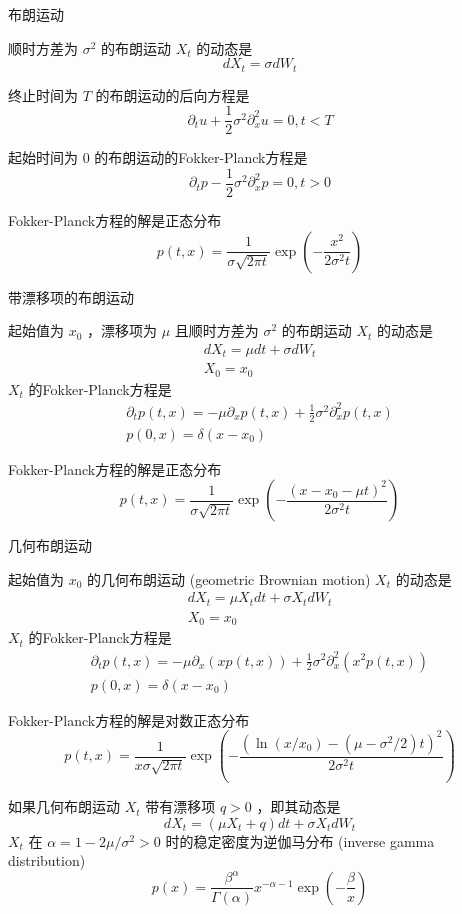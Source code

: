 布朗运动

顺时方差为 $\sigma^2$ 的布朗运动 $X_t$ 的动态是
$$
d X_t=\sigma d W_t
$$

终止时间为 $T$ 的布朗运动的后向方程是
$$
\partial_t u+\frac{1}{2} \sigma^2 \partial_x^2 u=0, t<T
$$

起始时间为 0 的布朗运动的Fokker-Planck方程是
$$
\partial_t p-\frac{1}{2} \sigma^2 \partial_x^2 p=0, t>0
$$

Fokker-Planck方程的解是正态分布
$$
p(t, x)=\frac{1}{\sigma \sqrt{2 \pi t}} \exp \left(-\frac{x^2}{2 \sigma^2 t}\right)
$$

带漂移项的布朗运动

起始值为 $x_0$ ，漂移项为 $\mu$ 且顺时方差为 $\sigma^2$ 的布朗运动 $X_t$ 的动态是
$$
\begin{gathered}
d X_t=\mu d t+\sigma d W_t \\
X_0=x_0
\end{gathered}
$$
$X_t$ 的Fokker-Planck方程是
$$
\begin{gathered}
\partial_t p(t, x)=-\mu \partial_x p(t, x)+\frac{1}{2} \sigma^2 \partial_x^2 p(t, x) \\
p(0, x)=\delta\left(x-x_0\right)
\end{gathered}
$$

Fokker-Planck方程的解是正态分布
$$
p(t, x)=\frac{1}{\sigma \sqrt{2 \pi t}} \exp \left(-\frac{\left(x-x_0-\mu t\right)^2}{2 \sigma^2 t}\right)
$$

几何布朗运动

起始值为 $x_0$ 的几何布朗运动 (geometric Brownian motion) $X_t$ 的动态是
$$
\begin{gathered}
d X_t=\mu X_t d t+\sigma X_t d W_t \\
X_0=x_0
\end{gathered}
$$
$X_t$ 的Fokker-Planck方程是
$$
\begin{gathered}
\partial_t p(t, x)=-\mu \partial_x(x p(t, x))+\frac{1}{2} \sigma^2 \partial_x^2\left(x^2 p(t, x)\right) \\
p(0, x)=\delta\left(x-x_0\right)
\end{gathered}
$$

Fokker-Planck方程的解是对数正态分布
$$
p(t, x)=\frac{1}{x \sigma \sqrt{2 \pi t}} \exp \left(-\frac{\left(\ln \left(x / x_0\right)-\left(\mu-\sigma^2 / 2\right) t\right)^2}{2 \sigma^2 t}\right)
$$

如果几何布朗运动 $X_t$ 带有漂移项 $q>0$ ，即其动态是
$$
d X_t=\left(\mu X_t+q\right) d t+\sigma X_t d W_t
$$
$X_t$ 在 $\alpha=1-2\mu/\sigma^2>0$ 时的稳定密度为逆伽马分布 (inverse gamma distribution)
$$
p(x)=\frac{\beta^\alpha}{\Gamma(\alpha)} x^{-\alpha-1} \exp \left(-\frac{\beta}{x}\right)
$$

